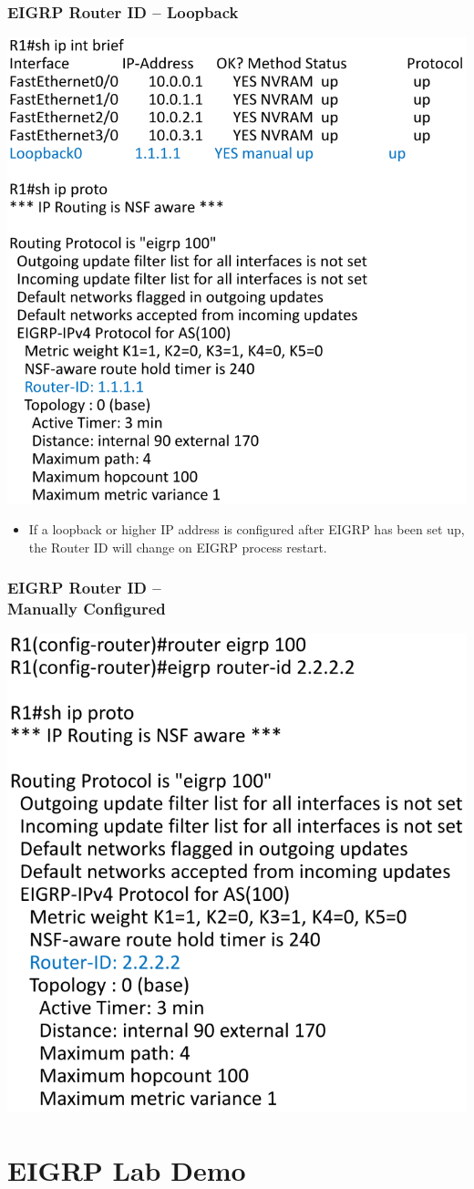 \documentclass[pdflatex,compress,mathserif]{beamer}
\begin{document}
\begin{frame}
	\frametitle{EIGRP Router ID – Loopback}
	\begin{multicols}{2}
		\begin{center}
			\includegraphics[width=\linewidth]{img/img21}
		\end{center}
		\columnbreak
		\begin{itemize}
			\item If a loopback or higher IP
address is configured after
EIGRP has been set up, the
Router ID will change on
EIGRP process restart.
		\end{itemize}
	\end{multicols}
\end{frame}

\begin{frame}
	\frametitle{EIGRP Router ID –\\ Manually Configured}
	\begin{center}
		\includegraphics[width=0.6\linewidth]{img/img22}
	\end{center}
\end{frame}

\section{EIGRP Lab Demo}
\end{document}
